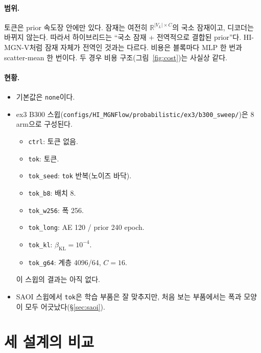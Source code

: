 \documentclass[11pt]{article}
\newcommand{\R}{\mathbb{R}}
\newcommand{\code}[1]{\texttt{#1}}
\begin{document}
\paragraph{범위.} 토큰은 prior 속도장 안에만 있다. 잠재는 여전히
$\R^{|V_L|\times C}$의 국소 잠재이고, 디코더는 바뀌지 않는다. 따라서
하이브리드는 ``국소 잠재 + 전역적으로 결합된 prior''다. HI-MGN-V처럼 잠재
자체가 전역인 것과는 다르다. 비용은 블록마다 MLP 한 번과 scatter-mean 한
번이다. 두 경우 비용 구조(그림~\ref{fig:cost})는 사실상 같다.

\paragraph{현황.}
\begin{itemize}
\item 기본값은 \code{none}이다.
\item ex3 B300 스윕(\code{configs/HI\_MGNFlow/probabilistic/ex3/b300\_sweep/})은
  8 arm으로 구성된다.
  \begin{itemize}
  \item \code{ctrl}: 토큰 없음.
  \item \code{tok}: 토큰.
  \item \code{tok\_seed}: \code{tok} 반복(노이즈 바닥).
  \item \code{tok\_b8}: 배치 8.
  \item \code{tok\_w256}: 폭 256.
  \item \code{tok\_long}: AE 120 / prior 240 epoch.
  \item \code{tok\_kl}: $\beta_{\text{KL}}=10^{-4}$.
  \item \code{tok\_g64}: 계층 4096/64, $C=16$.
  \end{itemize}
  이 스윕의 결과는 아직 없다.
\item SAOI 스윕에서 \code{tok}은 학습 부품은 잘 맞추지만, 처음 보는 부품에서는
  폭과 모양이 모두 어긋났다(\S\ref{sec:saoi}).
\end{itemize}

\section{세 설계의 비교}\label{sec:compare}
\end{document}
